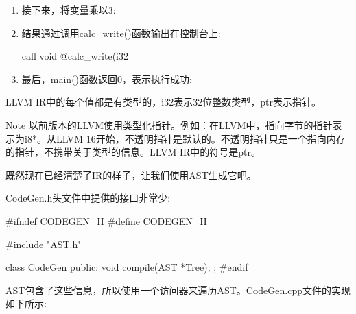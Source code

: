 \begin{enumerate}
\item
接下来，将变量乘以3:

\begin{shell}
\end{shell}

\item
结果通过调用calc\_write()函数输出在控制台上:

\begin{shell}
    call void @calc_write(i32 %
\end{shell}

\item
最后，main()函数返回0，表示执行成功:

\begin{shell}
    ret i32 0
}
\end{shell}

\end{enumerate}

LLVM IR中的每个值都是有类型的，i32表示32位整数类型，ptr表示指针。

\begin{myNotic}{Note}
以前版本的LLVM使用类型化指针。例如：在LLVM中，指向字节的指针表示为i8*。从LLVM 16开始，不透明指针是默认的。不透明指针只是一个指向内存的指针，不携带关于类型的信息。LLVM IR中的符号是ptr。
\end{myNotic}

既然现在已经清楚了IR的样子，让我们使用AST生成它吧。


CodeGen.h头文件中提供的接口非常少:

\begin{cpp}
#ifndef CODEGEN_H
#define CODEGEN_H

#include "AST.h"

class CodeGen
{
    public:
    void compile(AST *Tree);
};
#endif
\end{cpp}

AST包含了这些信息，所以使用一个访问器来遍历AST。CodeGen.cpp文件的实现如下所示:

